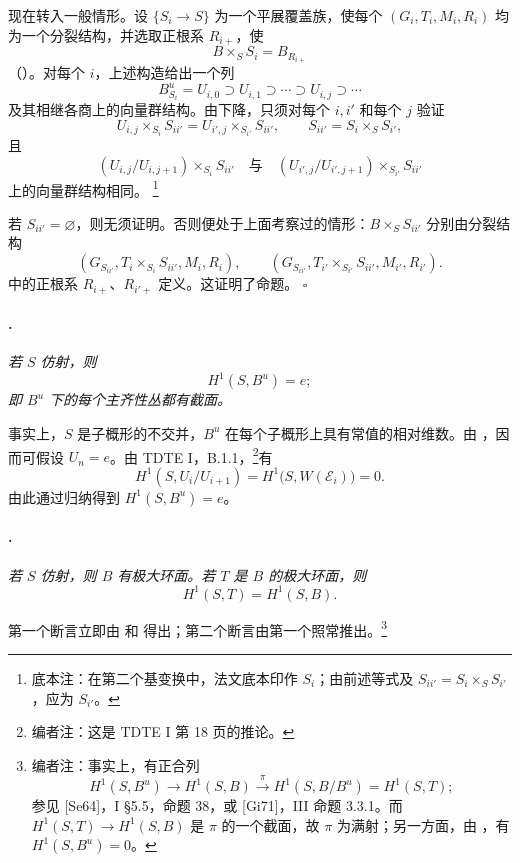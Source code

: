 现在转入一般情形。设 \(\{S_i\to S\}\) 为一个平展覆盖族，使每个 \((G_i,T_i,M_i,R_i)\) 均为一个分裂结构，并选取正根系 \(R_{i+}\)，使
\[
  B\times_S S_i=B_{R_{i+}}
\]
\textup{（\textup{}）}。对每个 \(i\)，上述构造给出一个列
\[
  B_{S_i}^u=U_{i,0}
  \supset U_{i,1}\supset\cdots
  \supset U_{i,j}\supset\cdots
\]
及其相继各商上的向量群结构。由下降，只须对每个 \(i,i'\) 和每个 \(j\) 验证
\[
  U_{i,j}\times_{S_i}S_{ii'}
  =
  U_{i',j}\times_{S_{i'}}S_{ii'},
  \qquad
  S_{ii'}=S_i\times_S S_{i'},
\]
且
\[
  (U_{i,j}/U_{i,j+1})\times_{S_i}S_{ii'}
  \quad\text{与}\quad
  (U_{i',j}/U_{i',j+1})\times_{S_{i'}}S_{ii'}
\]
上的向量群结构相同。\begingroup
\renewcommand{\thefootnote}{*}\footnote{底本注：在第二个基变换中，法文底本印作 \(S_i\)；由前述等式及 \(S_{ii'}=S_i\times_S S_{i'}\)，应为 \(S_{i'}\)。}
\addtocounter{footnote}{-1}\endgroup
若 \(S_{ii'}=\varnothing\)，则无须证明。否则便处于上面考察过的情形：\(B\times_S S_{ii'}\) 分别由分裂结构
\[
  (G_{S_{ii'}},
   T_i\times_{S_i}S_{ii'},M_i,R_i),
  \qquad
  (G_{S_{ii'}},
   T_{i'}\times_{S_{i'}}S_{ii'},M_{i'},R_{i'}).
\]
中的正根系 \(R_{i+}\)、\(R_{i'+}\) 定义。这证明了命题。
\hfill\(\square\)

\paragraph{.}
{\itshape 若 \(S\) 仿射，则
\[
  H^1(S,B^u)=e;
\]
即 \(B^u\) 下的每个主齐性丛都有截面。}

事实上，\(S\) 是子概形的不交并，\(B^u\) 在每个子概形上具有常值的相对维数。由 \textup{}，因而可假设 \(U_n=e\)。由 TDTE I，B.1.1，\setcounter{footnote}{55}\footnote{编者注：这是 TDTE I 第 18 页的推论。}有
\[
  H^1(S,U_i/U_{i+1})
  =
  H^1\bigl(S,W(\mathcal E_i)\bigr)
  =
  0.
\]
由此通过归纳得到 \(H^1(S,B^u)=e\)。

\paragraph{.}
{\itshape 若 \(S\) 仿射，则 \(B\) 有极大环面。若 \(T\) 是 \(B\) 的极大环面，则
\[
  H^1(S,T)=H^1(S,B).
\]}

第一个断言立即由  和  得出；第二个断言由第一个照常推出。\footnote{编者注：事实上，有正合列
\[
  H^1(S,B^u)\longrightarrow H^1(S,B)
  \xrightarrow{\;\pi\;}H^1(S,B/B^u)=H^1(S,T);
\]
参见 \textup{[Se64]}，I \S5.5，命题 38，或 \textup{[Gi71]}，III 命题 3.3.1。而 \(H^1(S,T)\to H^1(S,B)\) 是 \(\pi\) 的一个截面，故 \(\pi\) 为满射；另一方面，由 ，有 \(H^1(S,B^u)=0\)。}

